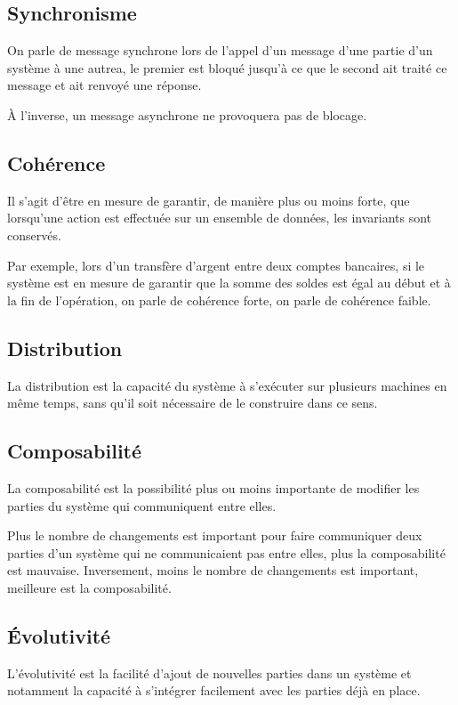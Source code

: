 \documentclass{article}
\begin{document}
\subsection{Synchronisme}
On parle de message synchrone lors de l'appel d'un message d'une partie d'un système
à une autrea,  le premier est bloqué jusqu'à ce que le second ait traité ce message
et ait renvoyé une réponse.

À l'inverse, un message asynchrone ne provoquera pas de blocage.

\subsection{Cohérence}
Il s'agit d'être en mesure de garantir, de manière plus ou moins forte, que lorsqu'une
action est effectuée sur un ensemble de données, les invariants sont conservés.

Par exemple, lors d'un transfère d'argent entre deux comptes bancaires, si le système
est en mesure de garantir que la somme des soldes est égal au début et à la fin
de l'opération, on parle de cohérence forte, on parle de cohérence faible.

\subsection{Distribution}
La distribution est la capacité du système à s'exécuter sur plusieurs machines en
même temps, sans qu'il soit nécessaire de le construire dans ce sens.

\subsection{Composabilité}
La composabilité est la possibilité plus ou moins importante de modifier les parties
du système qui communiquent entre elles.

Plus le nombre de changements est important pour faire communiquer deux parties
d'un système qui ne communicaient pas entre elles, plus la composabilité est mauvaise.
Inversement, moins le nombre de changements est important, meilleure est la composabilité.

\subsection{Évolutivité}
L'évolutivité est la facilité d'ajout de nouvelles parties dans un système et notamment
la capacité à s'intégrer facilement avec les parties déjà en place.
\end{document}
